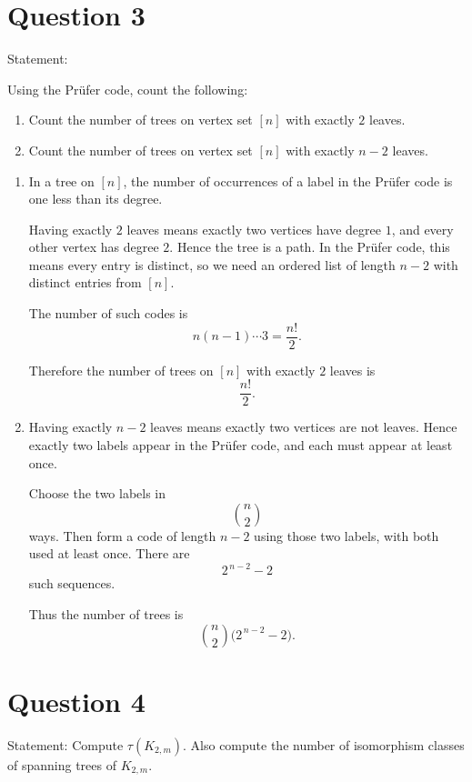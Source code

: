 \documentclass[11pt]{article}
\begin{document}
\newpage

\section*{Question 3}

Statement: {Using the Pr\"ufer code, count the following:
\begin{enumerate}
\item Count the number of trees on vertex set $[n]$ with exactly $2$ leaves.
\item Count the number of trees on vertex set $[n]$ with exactly $n-2$ leaves.
\end{enumerate}}

\medskip

\begin{enumerate}
\item In a tree on $[n]$, the number of occurrences of a label in the Pr\"ufer code is one less than its degree.

Having exactly $2$ leaves means exactly two vertices have degree $1$, and every other vertex has degree $2$. Hence the tree is a path. In the Pr\"ufer code, this means every entry is distinct, so we need an ordered list of length $n-2$ with distinct entries from $[n]$.

The number of such codes is
\[
n(n-1)\cdots 3=\frac{n!}{2}.
\]

Therefore the number of trees on $[n]$ with exactly $2$ leaves is
\[
\frac{n!}{2}.
\]

\item Having exactly $n-2$ leaves means exactly two vertices are not leaves. Hence exactly two labels appear in the Pr\"ufer code, and each must appear at least once.

Choose the two labels in
\[
\binom{n}{2}
\]
ways. Then form a code of length $n-2$ using those two labels, with both used at least once. There are
\[
2^{\,n-2}-2
\]
such sequences.

Thus the number of trees is
\[
\binom{n}{2}\bigl(2^{\,n-2}-2\bigr).
\]
\end{enumerate}

\newpage

\section*{Question 4}

Statement: {Compute $\tau(K_{2,m})$. Also compute the number of isomorphism classes of spanning trees of $K_{2,m}$.}
\end{document}
